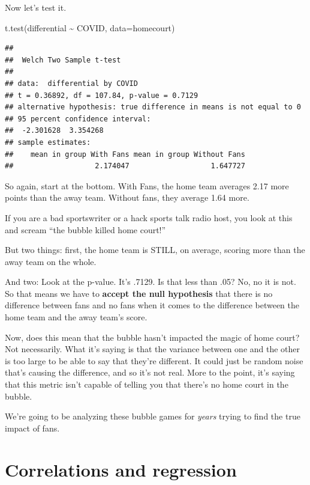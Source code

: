 \documentclass[
]{book}
\newenvironment{Shaded}{\begin{snugshade}}{\end{snugshade}}
\newcommand{\AttributeTok}[1]{\textcolor[rgb]{0.77,0.63,0.00}{#1}}
\newcommand{\FunctionTok}[1]{\textcolor[rgb]{0.00,0.00,0.00}{#1}}
\newcommand{\NormalTok}[1]{#1}
\newcommand{\SpecialCharTok}[1]{\textcolor[rgb]{0.00,0.00,0.00}{#1}}
\begin{document}
Now let's test it.

\begin{Shaded}
\begin{Highlighting}[]
\FunctionTok{t.test}\NormalTok{(differential }\SpecialCharTok{\textasciitilde{}}\NormalTok{ COVID, }\AttributeTok{data=}\NormalTok{homecourt)}
\end{Highlighting}
\end{Shaded}

\begin{verbatim}
## 
##  Welch Two Sample t-test
## 
## data:  differential by COVID
## t = 0.36892, df = 107.84, p-value = 0.7129
## alternative hypothesis: true difference in means is not equal to 0
## 95 percent confidence interval:
##  -2.301628  3.354268
## sample estimates:
##    mean in group With Fans mean in group Without Fans 
##                   2.174047                   1.647727
\end{verbatim}

So again, start at the bottom. With Fans, the home team averages 2.17 more points than the away team. Without fans, they average 1.64 more.

If you are a bad sportswriter or a hack sports talk radio host, you look at this and scream ``the bubble killed home court!''

But two things: first, the home team is STILL, on average, scoring more than the away team on the whole.

And two: Look at the p-value. It's .7129. Is that less than .05? No, no it is not. So that means we have to \textbf{accept the null hypothesis} that there is no difference between fans and no fans when it comes to the difference between the home team and the away team's score.

Now, does this mean that the bubble hasn't impacted the magic of home court? Not necessarily. What it's saying is that the variance between one and the other is too large to be able to say that they're different. It could just be random noise that's causing the difference, and so it's not real. More to the point, it's saying that this metric isn't capable of telling you that there's no home court in the bubble.

We're going to be analyzing these bubble games for \emph{years} trying to find the true impact of fans.

\hypertarget{correlations-and-regression}{%
\chapter{Correlations and regression}\label{correlations-and-regression}}
\end{document}
